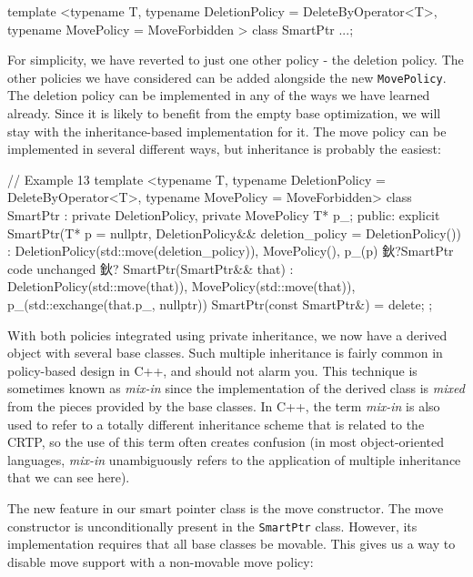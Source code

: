 \begin{code}
template <typename T,
  typename DeletionPolicy = DeleteByOperator<T>,
  typename MovePolicy = MoveForbidden
>
class SmartPtr ...;
\end{code}

For simplicity, we have reverted to just one other policy - the deletion policy. The other policies we have considered can be added alongside the new \texttt{MovePolicy}. The deletion policy can be implemented in any of the ways we have learned already. Since it is likely to benefit from the empty base optimization, we will stay with the inheritance-based implementation for it. The move policy can be implemented in several different ways, but inheritance is probably the easiest:

\begin{code}
// Example 13
template <typename T,
  typename DeletionPolicy = DeleteByOperator<T>,
  typename MovePolicy = MoveForbidden>
class SmartPtr : private DeletionPolicy,
                 private MovePolicy {
  T* p_;
  public:
  explicit SmartPtr(T* p = nullptr,
    DeletionPolicy&& deletion_policy = DeletionPolicy())
    : DeletionPolicy(std::move(deletion_policy)),
      MovePolicy(), p_(p) {}
  鈥?SmartPtr code unchanged 鈥?
  SmartPtr(SmartPtr&& that) :
    DeletionPolicy(std::move(that)),
    MovePolicy(std::move(that)),
    p_(std::exchange(that.p_, nullptr)) {}
  SmartPtr(const SmartPtr&) = delete;
};
\end{code}

With both policies integrated using private inheritance, we now have a derived object with several base classes. Such multiple inheritance is fairly common in policy-based design in C++, and should not alarm you. This technique is sometimes known as \emph{mix-in} since the implementation of the derived class is \emph{mixed} from the pieces provided by the base classes. In C++, the term \emph{mix-in} is also used to refer to a totally different inheritance scheme that is related to the CRTP, so the use of this term often creates confusion (in most object-oriented languages, \emph{mix-in} unambiguously refers to the application of multiple inheritance that we can see here).

The new feature in our smart pointer class is the move constructor. The move constructor is unconditionally present in the \texttt{SmartPtr} class. However, its implementation requires that all base classes be movable. This gives us a way to disable move support with a non-movable move policy:

